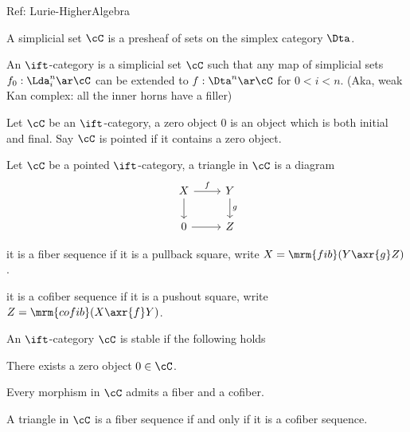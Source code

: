 \documentclass[article, a4paper, twoside]{universal}
\begin{document}
\confighead{}{}{}



Ref: Lurie-HigherAlgebra


\begin{dfn}
    A simplicial set $\cC$ is a presheaf of sets on the simplex category $\Dta$.
\end{dfn}

\begin{dfn}[0.0.0.1]
    An $\ift$-category is a simplicial set $\cC$ such that any map of simplicial sets $f_{0}:\Lda_{i}^{n}\ar\cC$ can be extended to $f:\Dta^{n}\ar\cC$ for $0<i<n$. (Aka, weak Kan complex: all the inner horns have a filler)
\end{dfn}

\begin{dfn}[1.1.1.1]
    Let $\cC$ be an $\ift$-category, a zero object $0$ is an object which is both initial and final. Say $\cC$ is pointed if it contains a zero object.
\end{dfn}

\begin{dfn}[1.1.1.4]
    Let $\cC$ be a pointed $\ift$-category, a triangle in $\cC$ is a diagram
    \[
        \begin{tikzcd}
            X\ar[r, "f"]\ar[d] & Y\ar[d, "g"] \\
            0 \ar[r] & Z
        \end{tikzcd}
    \]
    \begin{itm}
        \item it is a fiber sequence if it is a pullback square, write $X=\mrm{fib}(Y\axr{g}Z)$.
        \item it is a cofiber sequence if it is a pushout square, write $Z=\mrm{cofib}(X\axr{f}Y)$.
    \end{itm}
\end{dfn}

\begin{dfn}[1.1.1.9]
    An $\ift$-category $\cC$ is stable if the following holds
    \begin{enr}[label=(\arabic*)]
        \item There exists a zero object $0\in\cC$.
        \item Every morphism in $\cC$ admits a fiber and a cofiber.
        \item A triangle in $\cC$ is a fiber sequence if and only if it is a cofiber sequence.
    \end{enr}

\end{dfn}
\end{document}
